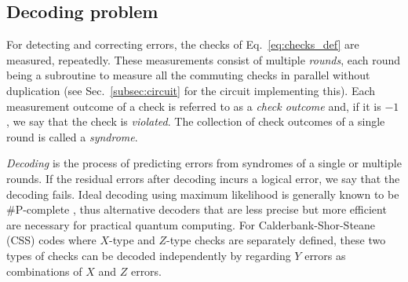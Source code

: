 \documentclass[a4paper,twocolumn,11pt,accepted=2025-01-21]{quantumarticle}
\theoremstyle{definition}
\theoremstyle{definition}
\theoremstyle{definition}
\begin{document}
\subsection{Decoding problem}

For detecting and correcting errors, the checks of Eq.~\eqref{eq:checks_def} are measured, repeatedly.
These measurements consist of multiple \textit{rounds}, each round being a subroutine to measure all the commuting checks in parallel without duplication (see Sec.~\ref{subsec:circuit} for the circuit implementing this).
Each measurement outcome of a check is referred to as a \emph{check outcome} and, if it is $-1$, we say that the check is \emph{violated}.
The collection of check outcomes of a single round is called a \emph{syndrome}.

\emph{Decoding} is the process of predicting errors from syndromes of a single or multiple rounds.
If the residual errors after decoding incurs a logical error, we say that the decoding fails.
Ideal decoding using maximum likelihood is generally known to be \textsf{\#P-complete} \cite{iyer2015hardness}, thus alternative decoders that are less precise but more efficient are necessary for practical quantum computing.
For Calderbank-Shor-Steane (CSS) codes where $X$-type and $Z$-type checks are separately defined, these two types of checks can be decoded independently by regarding $Y$ errors as combinations of $X$ and $Z$ errors.
\end{document}
